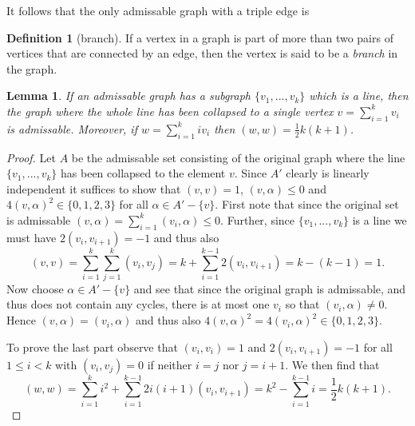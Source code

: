 \documentclass[twoside,utf8]{article}
\theoremstyle{plain}
\newtheorem{lemma}{Lemma}
\theoremstyle{definition}
\newtheorem{definition}{Definition}
\theoremstyle{remark}
\begin{document}
\noindent
It follows that the only admissable graph with a triple edge is
\begin{figure}[H]
\centering
{}
\end{figure}

\begin{definition}[branch]
If a vertex in a graph is part of more than two pairs of vertices that are connected by an edge, then the vertex is said to be a \textit{branch} in the graph.
\end{definition}


\begin{lemma} \label{lemma:ShrinkingLemma}
If an admissable graph has a subgraph $\{v_1,...,v_k\}$ which is a line, then the graph where the whole line has been collapsed to a single vertex $v=\sum_{i=1}^k v_i$ is admissable. Moreover, if $w=\sum_{i=1}^k i v_i$ then $(w,w)=\frac{1}{2}k(k+1)$.
\end{lemma}
\begin{proof}
Let $A$ be the admissable set consisting of the original graph where the line $\{v_1,...,v_k\}$ has been collapsed to the element $v$. Since $A'$ clearly is linearly independent it suffices to show that $(v,v)=1$, $(v,\alpha)\leq 0$ and $4(v,\alpha)^2\in \{0,1,2,3\}$ for all $\alpha\in A'-\{v\}$. First note that since the original set is admissable $(v,\alpha)=\sum_{i=1}^k (v_i,\alpha) \leq 0$. Further, since $\{v_1,...,v_k\}$ is a line we must have $2(v_i,v_{i+1})=-1$ and thus also
\[
(v,v)
= \sum_{i=1}^k \sum_{j=1}^k (v_i,v_j)
= k + \sum_{i=1}^{k-1} 2(v_i,v_{i+1})
= k-(k-1)
= 1.
\]
Now choose $\alpha\in A'-\{v\}$ and see that since the original graph is admissable, and thus does not contain any cycles, there is at most one $v_i$ so that $(v_i,\alpha)\neq 0$. Hence $(v,\alpha)=(v_i,\alpha)$ and thus also $4(v,\alpha)^2=4(v_i,\alpha)^2 \in \{0,1,2,3\}$.

To prove the last part observe that $(v_i,v_i)=1$ and $2(v_i,v_{i+1})=-1$ for all $1\leq i < k$ with $(v_i,v_j)=0$ if neither $i=j$ nor $j=i+1$. We then find that
\[
(w,w) 
= \sum_{i=1}^k i^2 + \sum_{i=1}^{k-1} 2i(i+1)(v_i,v_{i+1})
= k^2 - \sum_{i=1}^{k-1} i
= \frac{1}{2}k(k+1).
\]
\end{proof}
\end{document}
